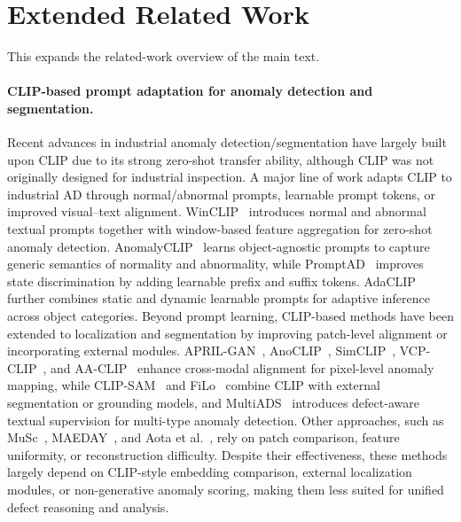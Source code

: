 \section{Extended Related Work}
\label{app:related}
This expands the related-work overview of the main text.

\paragraph{CLIP-based prompt adaptation for anomaly detection and segmentation.}
Recent advances in industrial anomaly detection/segmentation have largely built upon CLIP due to its strong zero-shot transfer ability, although CLIP was not originally designed for industrial inspection. A major line of work adapts CLIP to industrial AD through normal/abnormal prompts, learnable prompt tokens, or improved visual--text alignment. WinCLIP~\cite{jeong2023winclip} introduces normal and abnormal textual prompts together with window-based feature aggregation for zero-shot anomaly detection. AnomalyCLIP~\cite{zhou2024anomalyclip} learns object-agnostic prompts to capture generic semantics of normality and abnormality, while PromptAD~\cite{Li_2024_WACV} improves state discrimination by adding learnable prefix and suffix tokens. AdaCLIP~\cite{Cao_2024} further combines static and dynamic learnable prompts for adaptive inference across object categories. Beyond prompt learning, CLIP-based methods have been extended to localization and segmentation by improving patch-level alignment or incorporating external modules. APRIL-GAN~\cite{chen2023zero}, AnoCLIP~\cite{deng2024}, SimCLIP~\cite{simclip}, VCP-CLIP~\cite{qu2024vcpclip}, and AA-CLIP~\cite{ma2025aaclip} enhance cross-modal alignment for pixel-level anomaly mapping, while CLIP-SAM~\cite{li2024clipsamclipsamcollaboration} and FiLo~\cite{gu2024filozeroshotanomalydetection} combine CLIP with external segmentation or grounding models, and MultiADS~\cite{sadikaj2025multiadsdefectawaresupervisionmultitype} introduces defect-aware textual supervision for multi-type anomaly detection. Other approaches, such as MuSc~\cite{li2024musczeroshotindustrialanomaly}, MAEDAY~\cite{schwartz2024maeday}, and Aota et al.~\cite{aota2023zero}, rely on patch comparison, feature uniformity, or reconstruction difficulty. Despite their effectiveness, these methods largely depend on CLIP-style embedding comparison, external localization modules, or non-generative anomaly scoring, making them less suited for unified defect reasoning and analysis.

